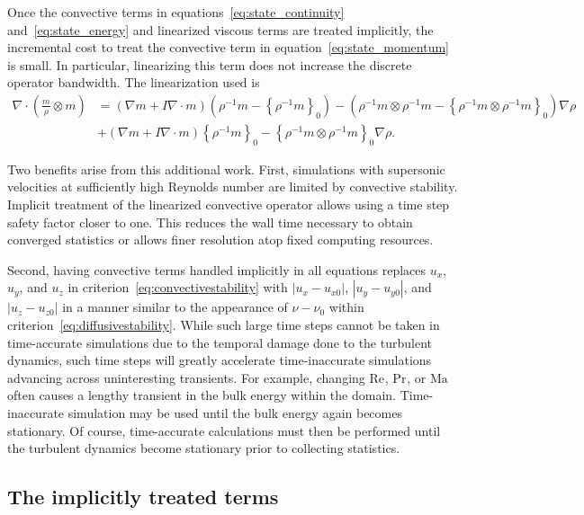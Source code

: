 \documentclass[letterpaper,11pt,nointlimits,reqno,draft]{amsbook}
\newcommand{\Mach}[1][]{\ensuremath{\mbox{Ma}_{#1}}}
\newcommand{\Reynolds}[1][]{\ensuremath{\mbox{Re}_{#1}}}
\newcommand{\Prandtl}[1][]{\ensuremath{\mbox{Pr}_{#1}}}
\newcommand{\reference}[1]{\ensuremath{\left\{#1\right\}_{0}}}
\newcommand{\lessreference}[1]
  {\ensuremath{\left({#1}-\reference{#1}\right)}}
\begin{document}
Once the convective terms in equations~\eqref{eq:state_continuity}
and~\eqref{eq:state_energy} and linearized viscous terms are treated
implicitly, the incremental cost to treat the convective term in
equation~\eqref{eq:state_momentum} is small.  In particular, linearizing this
term does not increase the discrete operator bandwidth.  The linearization used
is
\begin{align}
  \nabla\cdot\left(\frac{m}{\rho}\otimes{}m\right)
&=
    \left(\nabla{}m + I \nabla\cdot{}m\right)\lessreference{\rho^{-1}m}
  - \lessreference{\rho^{-1}m\otimes\rho^{-1}m}\nabla\rho
\\
 &+ \left(\nabla{}m + I \nabla\cdot{}m\right)\reference{\rho^{-1}m}
  - \reference{\rho^{-1}m\otimes\rho^{-1}m}\nabla\rho
  .
\end{align}

Two benefits arise from this additional work.  First, simulations with
supersonic velocities at sufficiently high Reynolds number are limited by
convective stability.  Implicit treatment of the linearized convective operator
allows using a time step safety factor closer to one.  This reduces the wall
time necessary to obtain converged statistics or allows finer resolution atop
fixed computing resources.

Second, having convective terms handled implicitly in all equations replaces
$u_x$, $u_y$, and $u_z$ in criterion~\eqref{eq:convectivestability} with
$\left|u_x-u_{x0}\right|$, $\left|u_y-u_{y0}\right|$, and
$\left|u_z-u_{z0}\right|$ in a manner similar to the appearance of $\nu-\nu_0$
within criterion~\eqref{eq:diffusivestability}.  While such large time steps
cannot be taken in time-accurate simulations due to the temporal damage done to
the turbulent dynamics, such time steps will greatly accelerate time-inaccurate
simulations advancing across uninteresting transients.  For example, changing
$\Reynolds$, $\Prandtl$, or $\Mach$ often causes a lengthy transient in the
bulk energy within the domain.  Time-inaccurate simulation may be used until
the bulk energy again becomes stationary.  Of course, time-accurate
calculations must then be performed until the turbulent dynamics become
stationary prior to collecting statistics.

\subsection{The implicitly treated terms}
\label{sec:implicitlytreatedterms}
\end{document}
